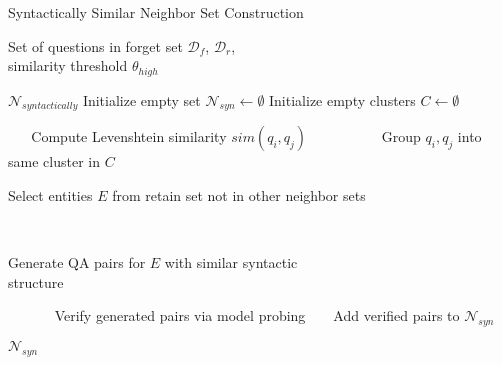 \begin{algorithm}
\small
\caption{\small Syntactically Similar Neighbor Set Construction}
\begin{algorithmic}[1]
  \Require \parbox[t]{\dimexpr\linewidth-\algorithmicindent}{%
  Set of questions in forget set $\mathcal{D}_f$, $\mathcal{D}_r$, \\
  similarity threshold $\theta_{high}$}
  \Ensure $\mathcal{N}_{syntactically}$
\vspace{0.2pt}
\State Initialize empty set $\mathcal{N}_{syn} \gets \emptyset$
\State Initialize empty clusters $C \gets \emptyset$

    \State Compute Levenshtein similarity $sim(q_i, q_j)$
        \State Group $q_i, q_j$ into same cluster in $C$
    \EndIf
\EndFor

    \State \parbox[t]{\dimexpr\linewidth - \algorithmicindent}{
    Select entities $E$ from retain set not in other neighbor sets
    }
    \vspace{0.2pt}
    \State \parbox[t]{\dimexpr\linewidth - \algorithmicindent}{
      Generate QA pairs for $E$ with similar syntactic \\
      structure
    }
    \vspace{0.2pt}
    \State Verify generated pairs via model probing
    \State Add verified pairs to $\mathcal{N}_{syn}$
\EndFor

\State \Return $\mathcal{N}_{syn}$
\end{algorithmic}
\label{algorithm:constructingDataset}
\end{algorithm}